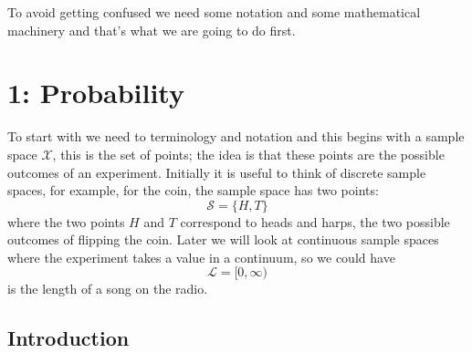 \documentclass[11pt,a4paper]{scrartcl}
\begin{document}
To avoid getting confused we need some notation and some mathematical
machinery and that's what we are going to do first.

\section*{1: Probability}

To start with we need to terminology and notation and this begins with
a sample space $\mathcal{X}$, this is the set of points; the idea is
that these points are the possible outcomes of an
experiment. Initially it is useful to think of discrete sample spaces,
for example, for the coin, the sample space has two points:
\begin{equation}
\mathcal{S}=\{H,T\}
\end{equation}
where the two points $H$ and $T$ correspond to heads and harps, the
two possible outcomes of flipping the coin. Later we will look at
continuous sample spaces where the experiment takes a value in a
continuum, so we could have
\begin{equation}
\mathcal{L}=[0,\infty)
\end{equation}
is the length of a song on the radio.







\subsection*{Introduction}
\end{document}
